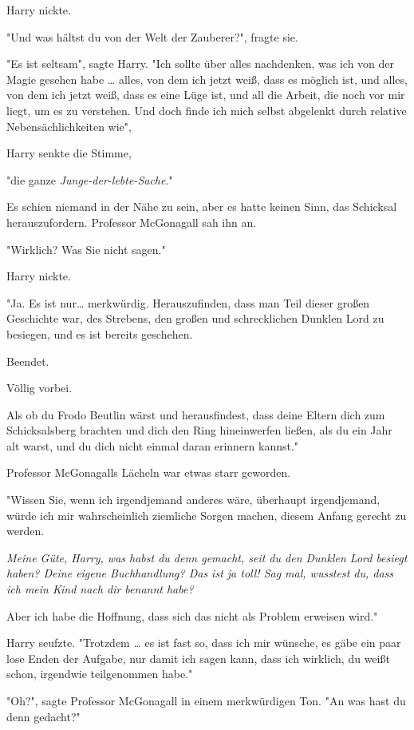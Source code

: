 {Harry nickte.

"Und was hältst du von der Welt der Zauberer?", fragte sie.

"Es ist seltsam", sagte Harry. "Ich sollte über alles nachdenken, was ich von der Magie gesehen habe … alles, von dem ich jetzt weiß, dass es möglich ist, und alles, von dem ich jetzt weiß, dass es eine Lüge ist, und all die Arbeit, die noch vor mir liegt, um es zu verstehen. Und doch finde ich mich selbst abgelenkt durch relative Nebensächlichkeiten wie",

Harry senkte die Stimme,

"die ganze \emph{Junge-der-lebte-Sache}."

Es schien niemand in der Nähe zu sein, aber es hatte keinen Sinn, das Schicksal herauszufordern. Professor McGonagall sah ihn an.

"Wirklich? Was Sie nicht sagen."

Harry nickte.

"Ja. Es ist nur… merkwürdig. Herauszufinden, dass man Teil dieser großen Geschichte war, des Strebens, den großen und schrecklichen Dunklen Lord zu besiegen, und es ist bereits geschehen.

Beendet.

Völlig vorbei.

Als ob du Frodo Beutlin wärst und herausfindest, dass deine Eltern dich zum Schicksalsberg brachten und dich den Ring hineinwerfen ließen, als du ein Jahr alt warst, und du dich nicht einmal daran erinnern kannst."

Professor McGonagalls Lächeln war etwas starr geworden.

"Wissen Sie, wenn ich irgendjemand anderes wäre, überhaupt irgendjemand, würde ich mir wahrscheinlich ziemliche Sorgen machen, diesem Anfang gerecht zu werden.

\emph{Meine Güte, Harry, was habst du denn gemacht, seit du den Dunklen Lord besiegt haben? Deine eigene Buchhandlung? Das ist ja toll! Sag mal, wusstest du, dass ich mein Kind nach dir benannt habe?}

Aber ich habe die Hoffnung, dass sich das nicht als Problem erweisen wird."

Harry seufzte. "Trotzdem … es ist fast so, dass ich mir wünsche, es gäbe ein paar lose Enden der Aufgabe, nur damit ich sagen kann, dass ich wirklich, du weißt schon, irgendwie teilgenommen habe."

"Oh?", sagte Professor McGonagall in einem merkwürdigen Ton. "An was hast du denn gedacht?"

}
